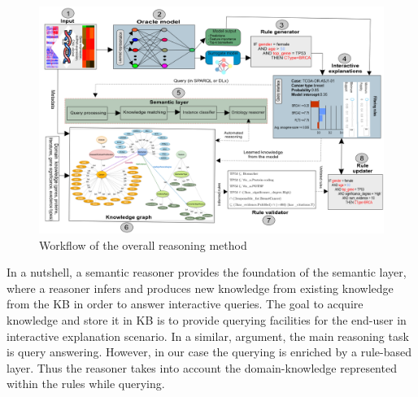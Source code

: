 \begin{figure}
	\centering
	\includegraphics[scale=0.8]{images/reasoning_wf.png}
	\caption{Workflow of the overall reasoning method} 
	\label{fig:reasoning_wf}
	\vspace{-2mm}
\end{figure} 

\hspace*{3.5mm} In a nutshell, a semantic reasoner provides the foundation of the semantic layer, where a reasoner infers and produces new knowledge from existing knowledge from the KB in order to answer interactive queries. 
The goal to acquire knowledge and store it in KB is to provide querying facilities for the end-user in interactive explanation scenario. In a similar, argument, the main reasoning task is query answering. However, in our case the querying is enriched by a rule-based layer. Thus the reasoner takes into account the domain-knowledge represented within the rules while querying. 

